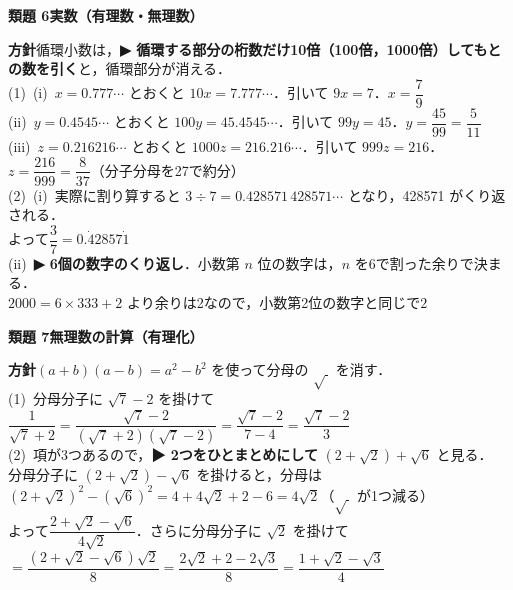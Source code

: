 \documentclass[a4paper,11pt]{ltjsarticle}
\newcommand{\ans}[2]{\Needspace{5\baselineskip}\vspace{6pt}%
  {\sffamily\bfseries 類題 #1\quad #2}\par}
\newcommand{\point}[1]{\textsf{\bfseries ▶ #1}}
\begin{document}
\ans{6}{実数（有理数・無理数）}
\begin{kai}
\textbf{方針}\quad 循環小数は，\point{循環する部分の桁数だけ10倍（100倍，1000倍）してもとの数を引く}と，循環部分が消える．\\[2pt]
(1)\ (i)\ $x=0.777\cdots$ とおくと $10x=7.777\cdots$．引いて $9x=7$．\quad $x=\dfrac79$\\[2pt]
\hspace*{1.5em}(ii)\ $y=0.4545\cdots$ とおくと $100y=45.4545\cdots$．引いて $99y=45$．\quad $y=\dfrac{45}{99}=\dfrac5{11}$\\[2pt]
\hspace*{1.5em}(iii)\ $z=0.216216\cdots$ とおくと $1000z=216.216\cdots$．引いて $999z=216$．\\
\hspace*{1.5em}$z=\dfrac{216}{999}=\dfrac{8}{37}$\quad（分子分母を27で約分）\\[2pt]
(2)\ (i)\ 実際に割り算すると $3\div7=0.428571\,428571\cdots$ となり，428571 がくり返される．\\
\hspace*{1.5em}よって\quad $\dfrac37=0.\dot42857\dot1$\\[2pt]
\hspace*{1.5em}(ii)\ \point{6個の数字のくり返し}．小数第 $n$ 位の数字は，$n$ を6で割った余りで決まる．\\
\hspace*{1.5em}$2000=6\times333+2$ より余りは2なので，小数第2位の数字と同じで\quad $2$
\end{kai}

\ans{7}{無理数の計算（有理化）}
\begin{kai}
\textbf{方針}\quad $(a+b)(a-b)=a^2-b^2$ を使って分母の $\sqrt{\ }$ を消す．\\[2pt]
(1)\ 分母分子に $\sqrt7-2$ を掛けて\\
\hspace*{1.5em}$\dfrac{1}{\sqrt7+2}=\dfrac{\sqrt7-2}{(\sqrt7+2)(\sqrt7-2)}=\dfrac{\sqrt7-2}{7-4}=\dfrac{\sqrt7-2}{3}$\\[4pt]
(2)\ 項が3つあるので，\point{2つをひとまとめにして} $(2+\sqrt2)+\sqrt6$ と見る．\\
\hspace*{1.5em}分母分子に $(2+\sqrt2)-\sqrt6$ を掛けると，分母は\\
\hspace*{1.5em}$(2+\sqrt2)^2-(\sqrt6)^2=4+4\sqrt2+2-6=4\sqrt2$\quad（$\sqrt{\ }$ が1つ減る）\\
\hspace*{1.5em}よって\quad $\dfrac{2+\sqrt2-\sqrt6}{4\sqrt2}$．さらに分母分子に $\sqrt2$ を掛けて\\[2pt]
\hspace*{1.5em}$=\dfrac{(2+\sqrt2-\sqrt6)\sqrt2}{8}=\dfrac{2\sqrt2+2-2\sqrt3}{8}=\dfrac{1+\sqrt2-\sqrt3}{4}$
\end{kai}
\end{document}
